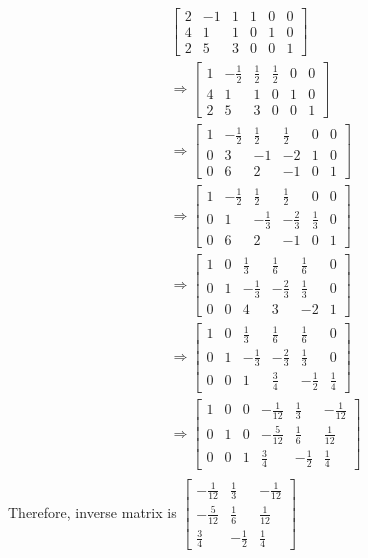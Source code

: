 \begin{align*}
    &\left[\begin{array}{ccc|ccc}
        2&-1&1&1&0&0\\4&1&1&0&1&0\\2&5&3&0&0&1
    \end{array}\right]\\
    &\Rightarrow\left[\begin{array}{ccc|ccc}
        1&-\frac{1}{2}&\frac{1}{2}&\frac{1}{2}&0&0\\
        4&1&1&0&1&0\\
        2&5&3&0&0&1
    \end{array}\right]\\
    &\Rightarrow\left[\begin{array}{ccc|ccc}
        1&-\frac{1}{2}&\frac{1}{2}&\frac{1}{2}&0&0\\
        0&3&-1&-2&1&0\\
        0&6&2&-1&0&1
    \end{array}\right]\\
    &\Rightarrow\left[\begin{array}{ccc|ccc}
        1&-\frac{1}{2}&\frac{1}{2}&\frac{1}{2}&0&0\\
        0&1&-\frac{1}{3}&-\frac{2}{3}&\frac{1}{3}&0\\
        0&6&2&-1&0&1
    \end{array}\right]\\
    &\Rightarrow\left[\begin{array}{ccc|ccc}
        1&0&\frac{1}{3}&\frac{1}{6}&\frac{1}{6}&0\\
        0&1&-\frac{1}{3}&-\frac{2}{3}&\frac{1}{3}&0\\
        0&0&4&3&-2&1
    \end{array}\right]\\
    &\Rightarrow\left[\begin{array}{ccc|ccc}
        1&0&\frac{1}{3}&\frac{1}{6}&\frac{1}{6}&0\\
        0&1&-\frac{1}{3}&-\frac{2}{3}&\frac{1}{3}&0\\
        0&0&1&\frac{3}{4}&-\frac{1}{2}&\frac{1}{4}
    \end{array}\right]\\
    &\Rightarrow\left[\begin{array}{ccc|ccc}
        1&0&0&-\frac{1}{12}&\frac{1}{3}&-\frac{1}{12}\\
        0&1&0&-\frac{5}{12}&\frac{1}{6}&\frac{1}{12}\\
        0&0&1&\frac{3}{4}&-\frac{1}{2}&\frac{1}{4}
    \end{array}\right]\\
\end{align*}
Therefore, inverse matrix is $\begin{bmatrix}
    -\frac{1}{12}&\frac{1}{3}&-\frac{1}{12}\\
    -\frac{5}{12}&\frac{1}{6}&\frac{1}{12}\\
    \frac{3}{4}&-\frac{1}{2}&\frac{1}{4}
\end{bmatrix}$
\newpage

